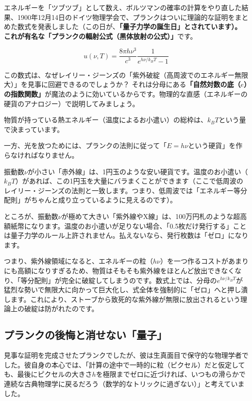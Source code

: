 エネルギーを「ツブツブ」として数え、ボルツマンの確率の計算をやり直した結果、1900年12月14日のドイツ物理学会で、プランクはついに理論的な証明をまとめた数式を発表しました（この日が、\textbf{「量子力学の誕生日」とされています）。 これが有名な「プランクの輻射公式（黒体放射の公式）」}です。

\[u(\nu, T) = \frac{8\pi h \nu^3}{c^3} \frac{1}{e^{h\nu/k_B T} - 1}\]

この数式は、なぜレイリー・ジーンズの「紫外破綻（高周波でのエネルギー無限大）」を見事に回避できるのでしょうか？ それは分母にある\textbf{「自然対数の底（\(e\)）の指数関数」}が魔法のように効いているからです。物理的な直感（エネルギーの硬貨のアナロジー）で説明してみましょう。

物質が持っている熱エネルギー（温度によるお小遣い）の総枠は、\(k_B T\)という量で決まっています。

一方、光を放つためには、プランクの法則に従って「\(E = h\nu\)という硬貨」を作らなければなりません。

振動数\(\nu\)が小さい「赤外線」は、1円玉のような安い硬貨です。温度のお小遣い（\(k_B T\)）があれば、この1円玉を大量にバラまくことができます（ここで低周波のレイリー・ジーンズの法則と一致します。つまり、低周波では「エネルギー等分配則」がちゃんと成り立っているように見えるのです）。

ところが、振動数\(\nu\)が極めて大きい「紫外線やX線」は、100万円札のような超高額紙幣になります。温度のお小遣いが足りない場合、「0.5枚だけ発行する」ことは量子力学のルール上許されません。払えないなら、発行枚数は「ゼロ」になります。

つまり、紫外線領域になると、エネルギーの粒（\(h\nu\)）を一つ作るコストがあまりにも高額になりすぎるため、物質はそもそも紫外線をほとんど放出できなくなり、「等分配則」が完全に破綻してしまうのです。数式上では、分母の\(e^{h\nu/k_B T}\)が猛烈な勢いで無限大に向かって巨大化し、式全体を強制的に「ゼロ」へと押し潰します。これにより、ストーブから致死的な紫外線が無限に放出されるという理論上の破綻は防がれたのです。

\subsection{プランクの後悔と消せない「量子」}

見事な証明を完成させたプランクでしたが、彼は生真面目で保守的な物理学者でした。彼自身の本心では、「計算の途中で一時的に粒（ピクセル）だと仮定しても、最後にピクセルの大きさ\(h\)を極限までゼロに近づければ、いつもの滑らかで連続な古典物理学に戻るだろう（数学的なトリックに過ぎない）」と考えていました。

